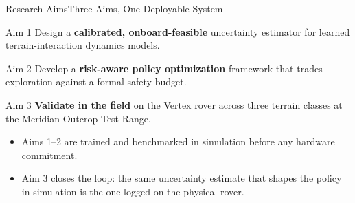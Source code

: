 \begin{frame}{Research Aims}{Three Aims, One Deployable System}
  \begin{minipage}[t]{0.32\textwidth}
    \begin{copperbox}{Aim 1}
      \footnotesize
      Design a \textbf{calibrated, onboard-feasible} uncertainty estimator
      for learned terrain-interaction dynamics models.
    \end{copperbox}
  \end{minipage}\hfill
  \begin{minipage}[t]{0.32\textwidth}
    \begin{copperbox}{Aim 2}
      \footnotesize
      Develop a \textbf{risk-aware policy optimization} framework that
      trades exploration against a formal safety budget.
    \end{copperbox}
  \end{minipage}\hfill
  \begin{minipage}[t]{0.32\textwidth}
    \begin{copperbox}{Aim 3}
      \footnotesize
      \textbf{Validate in the field} on the Vertex rover across three
      terrain classes at the Meridian Outcrop Test Range.
    \end{copperbox}
  \end{minipage}
  \par\vspace{12pt}

  \begin{itemize}
    \item Aims 1--2 are trained and benchmarked in simulation before any
      hardware commitment.
    \item Aim 3 closes the loop: the same uncertainty estimate that shapes
      the policy in simulation is the one logged on the physical rover.
  \end{itemize}
\end{frame}
